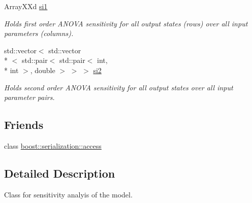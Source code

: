 \begin{DoxyCompactItemize}
Array\-X\-Xd \hyperlink{class_go_s_u_m_1_1_c_sensitivity_analysis_afa914a5ec4a2686c2a3eed9076c7afe4}{si1}
\begin{DoxyCompactList}\small\item\em Holds first order A\-N\-O\-V\-A sensitivity for all output states (rows) over all input parameters (columns). \end{DoxyCompactList}\item 
std\-::vector$<$ std\-::vector\\*
$<$ std\-::pair$<$ std\-::pair$<$ int, \\*
int $>$, double $>$ $>$ $>$ \hyperlink{class_go_s_u_m_1_1_c_sensitivity_analysis_aabc866244d32b74e89158997ea102f32}{si2}
\begin{DoxyCompactList}\small\item\em Holds second order A\-N\-O\-V\-A sensitivity for all output states over all input parameter pairs. \end{DoxyCompactList}\end{DoxyCompactItemize}
\subsection*{Friends}
\begin{DoxyCompactItemize}
\item 
class \hyperlink{class_go_s_u_m_1_1_c_sensitivity_analysis_ac98d07dd8f7b70e16ccb9a01abf56b9c}{boost\-::serialization\-::access}
\end{DoxyCompactItemize}


\subsection{Detailed Description}
Class for sensitivity analyis of the model. 

